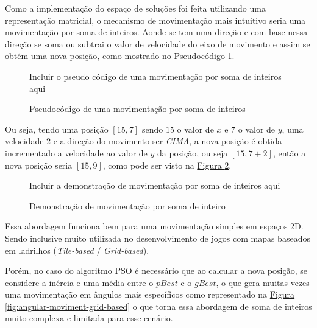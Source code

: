             Como a implementação do espaço de soluções foi feita utilizando uma representação matricial, o mecanismo de movimentação mais intuitivo seria uma movimentação por soma de inteiros.\newline
            Aonde se tem uma direção e com base nessa direção se soma ou subtrai o valor de velocidade do eixo de movimento e assim se obtém uma nova posição, como mostrado no 
            \hyperref[alg:mov-int-sum]{Pseudocódigo \ref{alg:mov-int-sum}}.\hfill

            \begin{figure}[ht]
                \centering
                \small{Incluir o pseudo código de uma movimentação por soma de inteiros aqui}
                \caption{Pseudocódigo de uma movimentação por soma de inteiros}
                \label{alg:mov-int-sum}
            \end{figure}
            
            Ou seja, tendo uma posição $[15, 7]$ sendo $15$ o valor de $x$ e $7$ o valor de $y$,
            uma velocidade $2$ e a direção do movimento ser \textit{CIMA}, a nova posição é obtida incrementado a velocidade ao valor de $y$ da posição, ou seja $[15, 7+2]$, então a nova posição seria $[15, 9]$, como pode ser visto na 
            \hyperref[fig:movimentacao-int-sum]{Figura \ref{fig:movimentacao-int-sum}}.\hfill
            
            \begin{figure}[ht]
                \centering
                \small{Incluir a demonstração de movimentação por soma de inteiros aqui}
                \caption{Demonstração de movimentação por soma de inteiro}
                \label{fig:movimentacao-int-sum}
            \end{figure}
            
            Essa abordagem funciona bem para uma movimentação simples em espaços 2D. Sendo inclusive muito utilizada no desenvolvimento de jogos com mapas baseados em ladrilhos (\textit{Tile-based} / \textit{Grid-based}).\hfill\vspace{\onelineskip}
            
            Porém, no caso do algoritmo PSO é necessário que ao calcular a nova posição, se considere a inércia e uma média entre o $pBest$ e o $gBest$, o que gera muitas vezes uma movimentação em ângulos mais específicos como representado na 
            \hyperref[fig:angular-moviment-grid-based]{Figura \ref{fig:angular-moviment-grid-based}}
            o que torna essa abordagem de soma de inteiros muito complexa e limitada para esse cenário.\hfill
            
